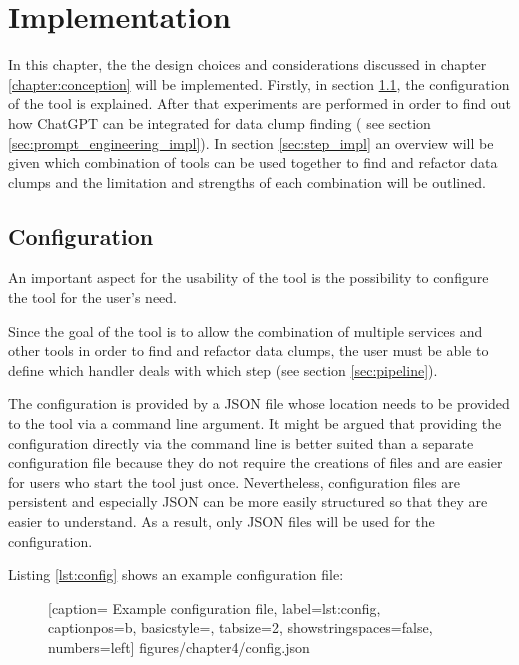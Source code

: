 
\begingroup
\renewcommand{\cleardoublepage}{} %
\renewcommand{\clearpage}{}
\chapter{Implementation}\label{chapter:implementation}
\endgroup
In this chapter, the the design choices and considerations discussed in chapter \ref{chapter:conception} will be implemented. Firstly, in section \ref{sec:config}, the configuration of the tool is explained. After that experiments are performed in order to find out how ChatGPT can be integrated for data clump finding ( see section \ref{sec:prompt_engineering_impl}). In section \ref{sec:step_impl} an overview will be given which combination of tools can be used together to find and refactor data clumps and the limitation and strengths of each combination will be outlined. 
\section{Configuration}\label{sec:config}
An important aspect for the usability of the tool is the possibility to configure the tool for the user's need. 

Since the goal of the tool is to allow the combination of multiple services and other tools in order to find and refactor data clumps, the user must be able to define which handler deals with which step (see section \ref{sec:pipeline}).

The configuration is provided by a \ac{JSON} file whose location needs to be provided to the tool via a command line argument. It might be argued that providing the configuration directly via the command line is better suited than a separate configuration file because they do not require the creations of files and are easier for users who start the tool just once. Nevertheless, configuration files are persistent and especially \ac{JSON} can be more easily structured so that they are easier to understand. As a result, only \ac{JSON} files will be used  for the configuration. 


Listing \ref{lst:config} shows an example configuration file:
  \begin{figure} [htbp!]
			
			[caption={ Example configuration file},
			label={lst:config},
			captionpos=b, basicstyle=\footnotesize, tabsize=2, showstringspaces=false,  numbers=left]
			{figures/chapter4/config.json}
		\end{figure}


